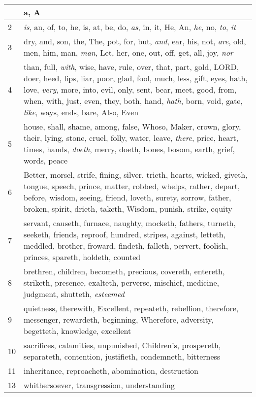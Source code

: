 \begin{center}
\begin{longtable}{l|p{3.75in}}
\hline \hline 
\endlastfoot 
1 & a, A\\ \hline 
2 & \emph{is}, an, of, to, he, is, at, be, do, \emph{as}, in, it, He, An, \emph{he}, no, \emph{to}, \emph{it}\\ \hline 
3 & dry, and, son, the, The, pot, for, but, \emph{and}, ear, his, not, \emph{are}, old, men, him, man, \emph{man}, Let, her, one, out, off, get, all, joy, \emph{nor}\\ \hline 
4 & than, full, \emph{with}, wise, have, rule, over, that, part, gold, LORD, doer, heed, lips, liar, poor, glad, fool, much, less, gift, eyes, hath, love, \emph{very}, more, into, evil, only, sent, bear, meet, good, from, when, with, just, even, they, both, hand, \emph{hath}, born, void, gate, \emph{like}, ways, ends, bare, Also, Even\\ \hline 
5 & house, shall, shame, among, false, Whoso, Maker, crown, glory, their, lying, stone, cruel, folly, water, leave, \emph{there}, price, heart, times, hands, \emph{doeth}, merry, doeth, bones, bosom, earth, grief, words, peace\\ \hline 
6 & Better, morsel, strife, fining, silver, trieth, hearts, wicked, giveth, tongue, speech, prince, matter, robbed, whelps, rather, depart, before, wisdom, seeing, friend, loveth, surety, sorrow, father, broken, spirit, drieth, taketh, Wisdom, punish, strike, equity\\ \hline 
7 & servant, causeth, furnace, naughty, mocketh, fathers, turneth, seeketh, friends, reproof, hundred, stripes, against, letteth, meddled, brother, froward, findeth, falleth, pervert, foolish, princes, spareth, holdeth, counted\\ \hline 
8 & brethren, children, becometh, precious, covereth, entereth, striketh, presence, exalteth, perverse, mischief, medicine, judgment, shutteth, \emph{esteemed}\\ \hline 
9 & quietness, therewith, Excellent, repeateth, rebellion, therefore, messenger, rewardeth, beginning, Wherefore, adversity, begetteth, knowledge, excellent\\ \hline 
10 & sacrifices, calamities, unpunished, Children's, prospereth, separateth, contention, justifieth, condemneth, bitterness\\ \hline 
11 & inheritance, reproacheth, abomination, destruction\\ \hline 
13 & whithersoever, transgression, understanding\\ \hline 
\end{longtable} 
\end{center} 




 
